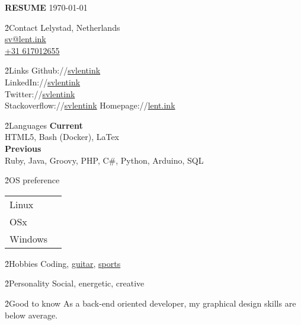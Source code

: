 \LARGE \textbf{RESUME}
\scriptsize \today \normalsize



\h{2}{Contact}{}
Lelystad, Netherlands \\
\href{mailto:sv@lent.ink}{sv@lent.ink} \\
\href{tel:0031617012655}{+31 617012655}

\h{2}{Links}{}
Github://\href{http://github.com/svlentink}{svlentink} \\
LinkedIn://\href{http://linkedin.com/in/svlentink}{svlentink} \\
Twitter://\href{http://twitter.com/svlentink}{svlentink} \\
Stackoverflow://\href{http://stackoverflow.com/users/3037245/svlentink}{svlentink}
Homepage://\href{http://lent.ink}{lent.ink}

\h{2}{Languages}{}
\textbf{Current} \\
HTML5,
Bash (Docker),
LaTex
\\
\textbf{Previous} \\
Ruby,
Java,
Groovy,
PHP,
C\#,
Python,
Arduino,
SQL

\h{2}{OS preference}{}
\begin{tabu} to  \linewidth { X[l]X[r] }
  Linux &  \\
	OSx &  \\
	Windows & 
\end{tabu}

\h{2}{Hobbies}{}
Coding,
\href{http://svlentink.co.nf/chords}{guitar},
\href{http://svlentink.co.nf/run}{sports}

\h{2}{Personality}{}
Social, energetic, creative

\h{2}{Good to know}{}
As a back-end oriented developer,
my graphical design skills are below average.
